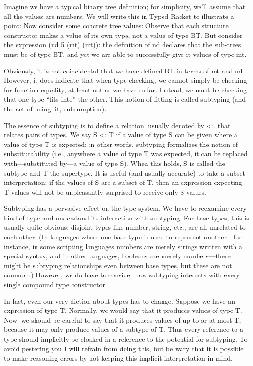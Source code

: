
Imagine we have a typical binary tree definition; for simplicity, we’ll assume
that all the values are numbers. We will write this in Typed Racket to
illustrate a point:
Now consider some concrete tree values:
Observe that each structure constructor makes a value of its own type, not a
value of type BT. But consider the expression (nd 5 (mt) (mt)): the definition
of nd declares that the sub-trees must be of type BT, and yet we are able to
successfully give it values of type mt.

Obviously, it is not coincidental that we have defined BT in terms of mt and nd.
However, it does indicate that when type-checking, we cannot simply be checking
for function equality, at least not as we have so far. Instead, we must be
checking that one type “fits into” the other. This notion of fitting is called
subtyping (and the act of being fit, subsumption).

The essence of subtyping is to define a relation, usually denoted by <:, that
relates pairs of types. We say S <: T if a value of type S can be given where a
value of type T is expected: in other words, subtyping formalizes the notion of
substitutability (i.e., anywhere a value of type T was expected, it can be
replaced with—substituted by—a value of type S). When this holds, S is called
the subtype and T the supertype. It is useful (and usually accurate) to take a
subset interpretation: if the values of S are a subset of T, then an expression
expecting T values will not be unpleasantly surprised to receive only S values.

Subtyping has a pervasive effect on the type system. We have to reexamine every
kind of type and understand its interaction with subtyping. For base types, this
is usually quite obvious: disjoint types like number, string, etc., are all
unrelated to each other. (In languages where one base type is used to represent
another—for instance, in some scripting languages numbers are merely strings
written with a special syntax, and in other languages, booleans are merely
numbers—there might be subtyping relationships even between base types, but
these are not common.) However, we do have to consider how subtyping interacts
with every single compound type constructor

In fact, even our very diction about types has to change. Suppose we have an
expression of type T. Normally, we would say that it produces values of type T.
Now, we should be careful to say that it produces values of up to or at most T,
because it may only produce values of a subtype of T. Thus every reference to a
type should implicitly be cloaked in a reference to the potential for subtyping.
To avoid pestering you I will refrain from doing this, but be wary that it is
possible to make reasoning errors by not keeping this implicit interpretation in
mind.


